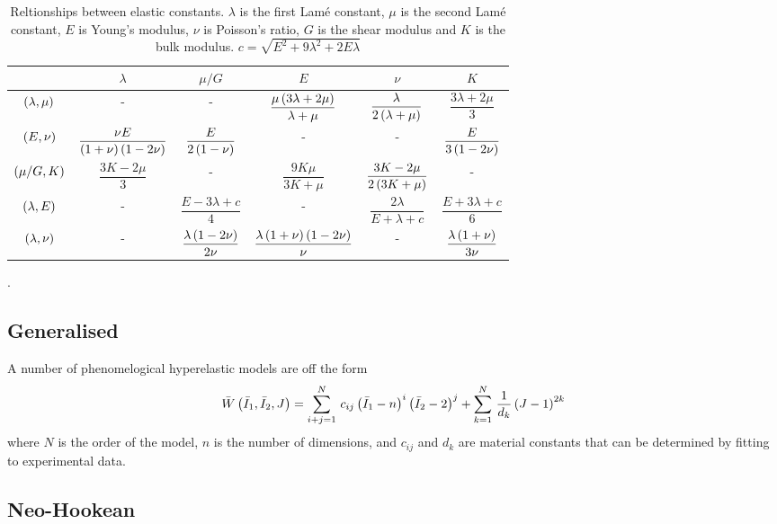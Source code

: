 \begin{table}[htb] \centering
  \begin{tabular}{|c|c|c|c|c|c|} \hline
    & $\lambda$ & $\mu/G$ & $E$ & $\nu$ & $K$ \\ \hline \hline
    $\left( \lambda,\mu \right)$ & - & - &
    $\dfrac{\mu\left( 3\lambda+2\mu \right)}{\lambda+\mu}$ & $\dfrac{\lambda}{2\left( \lambda+\mu \right)}$ & $\dfrac{3\lambda+2\mu}{3}$ \\ \hline
    $\left( E,\nu \right)$ & $\dfrac{\nu E}{\left( 1+\nu \right)\left( 1-2\nu \right)}$ & $\dfrac{E}{2\left( 1-\nu \right)}$ &
    - & - & $\dfrac{E}{3\left( 1-2\nu \right)}$ \\ \hline
    $\left( \mu/G,K \right)$ & $\dfrac{3K-2\mu}{3}$ & - & $\dfrac{9K\mu}{3K+\mu}$ &
    $\dfrac{3K-2\mu}{2\left( 3K+\mu \right)}$ & - \\ \hline
    $\left( \lambda,E \right)$ & - & $\dfrac{E-3\lambda+c}{4}$ & - &
    $\dfrac{2\lambda}{E+\lambda+c}$ &
    $\dfrac{E+3\lambda+c}{6}$ \\ \hline
    $\left( \lambda,\nu \right)$ & - & $\dfrac{\lambda\left( 1-2\nu \right)}{2\nu}$ & $\dfrac{\lambda\left( 1+\nu \right)\left( 1-2\nu \right)}{\nu}$ & - & $\dfrac{\lambda\left( 1+\nu \right)}{3\nu}$ \\ \hline
  \end{tabular}
  \caption{Reltionships between elastic constants. $\lambda$ is the first
    Lam\'e constant, $\mu$ is the second Lam\'e constant, $E$ is Young's
    modulus, $\nu$ is Poisson's ratio, $G$ is the shear modulus and $K$ is the
    bulk modulus. $c=\sqrt{E^{2}+9\lambda^{2}+2E\lambda}$}.
  \label{tab:RelationshipBetweenElasticConstants}
\end{table}


\subsection{Generalised}

A number of phenomelogical hyperelastic models are off the form
\begin{equation}
   \bar{W}\left( \bar{I}_{1},\bar{I}_{2},J \right) =  \displaystyle\sum_{i+j=1}^{N} \,c_{ij}\left( \bar{I}_{1}-n \right)^{i}\left( \bar{I}_{2}-2 \right)^{j} +  \displaystyle\sum_{k=1}^{N} \,\dfrac{1}{d_{k}}\left( J-1 \right)^{2k} 
\end{equation}
where $N$ is the order of the model, $n$ is the number of dimensions, and $c_{ij}$ and $d_{k}$ are material constants that can be determined by fitting to experimental data.

\subsection{Neo-Hookean}

